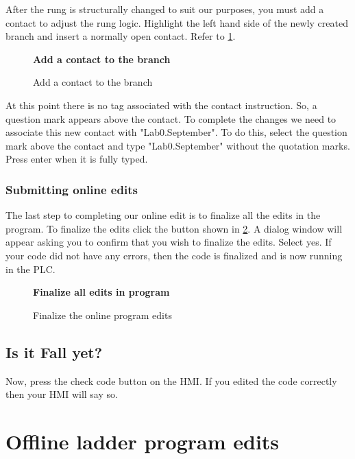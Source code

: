 After the rung is structurally changed to suit our purposes, you must add a contact to adjust the rung logic. Highlight the left hand side of the newly created branch and insert a normally open contact. Refer to \figureautorefname \ref{fig:AddContact}.

\begin{figure}[h]
\centering
\textbf{Add a contact to the branch}\par \medskip
{}
\caption{Add a contact to the branch}
\label{fig:AddContact}
\end{figure}

At this point there is no tag associated with the contact instruction. So, a question mark appears above the contact. To complete the changes we need to associate this new contact with "Lab0.September". To do this, select the question mark above the contact and type "Lab0.September" without the quotation marks. Press enter when it is fully typed.

\subsubsection{Submitting online edits}

The last step to completing our online edit is to finalize all the edits in the program. To finalize the edits click the button shown in \figureautorefname \ref{fig:FinalizeEdits}. A dialog window will appear asking you to confirm that you wish to finalize the edits. Select yes. If your code did not have any errors, then the code is finalized and is now running in the PLC.

\begin{figure}[h]
\centering
\textbf{Finalize all edits in program}\par \medskip
{}
\caption{Finalize the online program edits}
\label{fig:FinalizeEdits}
\end{figure}

\subsection{Is it Fall yet?}

Now, press the check code button on the HMI. If you edited the code correctly then your HMI will say so. 

\TASignatureSlot


\section{Offline ladder program edits}

